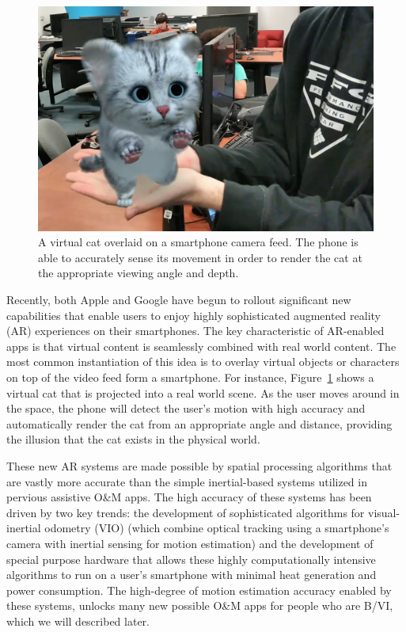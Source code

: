 \documentclass[chi_draft]{sigchi}
\newcommand{\BVI}{B/VI\xspace}
\newcommand{\OM}{O\&M\xspace}
\begin{document}
\begin{figure}
\begin{center}
\includegraphics[width=.9\linewidth]{Figures/arexample.png}
\end{center}
\caption{A virtual cat overlaid on a smartphone camera feed.  The phone is able to accurately sense its movement in order to render the cat at the appropriate viewing angle and depth.\label{fig:arexample}}
\end{figure}

Recently, both Apple and Google have begun to rollout significant new capabilities that enable users to enjoy highly sophisticated augmented reality (AR) experiences on their smartphones.  The key characteristic of AR-enabled apps is that virtual content is seamlessly combined with real world content.  The most common instantiation of this idea is to overlay virtual objects or characters on top of the video feed form a smartphone.  For instance, Figure~\ref{fig:arexample} shows a virtual cat that is projected into a real world scene.  As the user moves around in the space, the phone will detect the user's motion with high accuracy and automatically render the cat from an appropriate angle and distance, providing the illusion that the cat exists in the physical world.

These new AR systems are made possible by spatial processing algorithms that are vastly more accurate than the simple inertial-based systems utilized in pervious assistive \OM apps.  The high accuracy of these systems has been driven by two key trends: the development of sophisticated algorithms for visual-inertial odometry (VIO) \cite{li2013high,leutenegger2015keyframe,bloesch2015robust,forster2014svo} (which combine optical tracking using a smartphone's camera with inertial sensing for motion estimation) and the development of special purpose hardware that allows these highly computationally intensive algorithms to run on a user's smartphone with minimal heat generation and power consumption.  The high-degree of motion estimation accuracy enabled by these systems, unlocks many new possible \OM apps for people who are \BVI, which we will described later.
\end{document}
